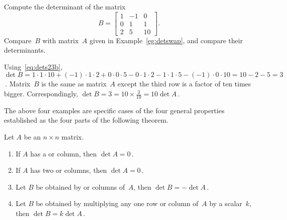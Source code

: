 \begin{example} \label{eg:}
Compute the determinant of the matrix
\begin{equation*}
B=\begin{bmatrix} 1&-1&0
\\0&1&1
\\2&5&10 \end{bmatrix}.
\end{equation*}
Compare~\(B\) with matrix~\(A\) given in Example~\ref{eg:detswap}, and compare their determinants.
\begin{solution} 
Using~\eqref{eq:dets23b}, \(\det B 
=1\cdot1\cdot10 +(-1)\cdot1\cdot2 +0\cdot0\cdot5
-0\cdot1\cdot2 -1\cdot1\cdot5 -(-1)\cdot0\cdot10 
=10-2-5=3\)\,.  
Matrix~\(B\) is the same as matrix~\(A\) except the third row is a factor of ten times bigger.
Correspondingly, \(\det B=3=10\times\frac3{10}=10\det A\)\,.
\end{solution}
\end{example}






The above four examples are specific cases of the four general properties established as the four parts of the following theorem. 


\begin{theorem} \label{thm:ppdet} 
Let \(A\) be an \(n\times n\) matrix.
\begin{enumerate}
\item\label{thm:ppdet:i} 
If \(A\) has a  or column, then \(\det A=0\)\,.
\item\label{thm:ppdet:ii} 
If \(A\) has two  or columns, then  \(\det A=0\)\,.
\item\label{thm:ppdet:iii} 
Let \(B\) be obtained by  or columns of~\(A\), then \(\det B=-\det A\)\,.
\item\label{thm:ppdet:iv} 
Let \(B\) be obtained by multiplying any one row or column of~\(A\) by a scalar~\(k\), then \(\det B=k\det A\)\,.
\end{enumerate}
\end{theorem}

